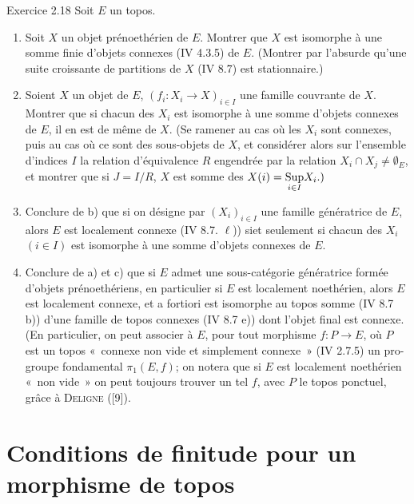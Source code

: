 \documentclass[10pt]{../fichiers-configuration-latex/smfart}
\begin{document}
\begin{enonce*}[remark]{Exercice 2.18}
Soit $E$ un topos.
\begin{enumerate}
\renewcommand{\theenumi}{\alph{enumi}}
\renewcommand{\labelenumi}{\theenumi)}
\item Soit $X$ un objet prénoethérien de $E$. Montrer que $X$ est
  isomorphe à une somme finie d'objets connexes (IV 4.3.5) de
  $E$. (Montrer par l'absurde qu'une suite croissante de partitions de
  $X$ (IV 8.7) est stationnaire.)

\item Soient $X$ un objet de $E$, $(f_i : X_i \to X)_{i \in I}$ une
  famille couvrante de $X$. Montrer que si chacun des $X_i$ est
  isomorphe à une somme d'objets connexes de $E$, il en est de même de
  $X$. (Se ramener au cas où les $X_i$ sont connexes, puis au cas où
  ce sont des sous-objets de $X$, et considérer alors sur l'ensemble
  d'indices $I$ la relation d'équivalence $R$ engendrée par la
  relation $X_i \cap X_j \neq ∅_E$, et montrer que si $J = I/R$,
  $X$ est somme des $X(i) = \displaystyle{\mathop{\operatorname{Sup}}_{i \in I}} X_i
  .)$

\item Conclure de b) que si on désigne par $(X_i)_{i \in I}$ une
  famille génératrice de $E$, alors $E$ est localement connexe (IV
  8.7. $\ell$)) si\pageoriginale et seulement si chacun des $X_i$ $(i \in I)$
  est isomorphe à une somme d'objets connexes de $E$.

\item Conclure de a) et c) que si $E$ admet une sous-catégorie
  génératrice formée d'objets prénoethériens, en particulier si $E$
  est localement noethérien, alors $E$ est localement connexe, et a
  fortiori est isomorphe au topos somme (IV 8.7 b)) d'une famille de
  topos connexes (IV 8.7 e)) \ie dont l'objet final est connexe. (En
  particulier, on peut associer à $E$, pour tout morphisme $f : P \to
  E$, où $P$ est un topos « connexe non vide et simplement
  connexe » (IV 2.7.5) un pro-groupe fondamental $\pi_1(E, f)$; on
  notera que si $E$ est localement noethérien « non vide » on peut
  toujours trouver un tel $f$, avec $P$ le topos ponctuel, grâce à
  \textsc{Deligne} ([9]).
\end{enumerate}
\end{enonce*}

\section{Conditions de finitude pour un morphisme de topos}
\end{document}
